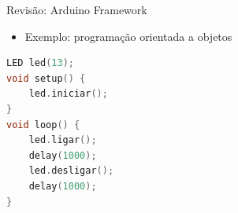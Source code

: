 \begin{frame}[fragile]{Revisão: Arduino Framework}
    \begin{itemize}
        \item Exemplo: programação orientada a objetos
    \end{itemize}

\begin{lstlisting}[language=C++,basicstyle=\ttfamily\scriptsize]
LED led(13);
void setup() {
    led.iniciar();
}
void loop() {
    led.ligar();
    delay(1000);
    led.desligar();
    delay(1000);
}
\end{lstlisting}
\end{frame}
